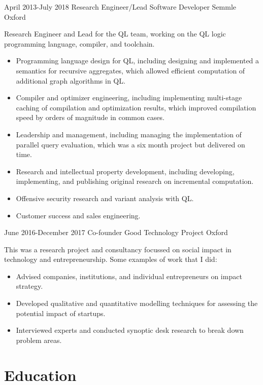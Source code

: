 \documentclass[12pt,a4paper,sans]{moderncv}
\begin{document}
\cventry
{April 2013-July 2018}
{Research Engineer/Lead Software Developer}
{Semmle}
{Oxford}
{}
{
  Research Engineer and Lead for the QL team, working on the QL logic programming language, compiler, and toolchain.
  \begin{itemize}
    \item Programming language design for QL, including designing and implemented a semantics for recursive aggregates, which allowed efficient computation of additional graph algorithms in QL.
    \item Compiler and optimizer engineering, including implementing multi-stage caching of compilation and optimization results, which improved compilation speed by orders of magnitude in common cases.
    \item Leadership and management, including managing the implementation of parallel query evaluation, which was a six month project but delivered on time.
    \item Research and intellectual property development, including developing, implementing, and publishing original research on incremental computation.
    \item Offensive security research and variant analysis with QL.
    \item Customer success and sales engineering.
  \end{itemize}
}

\cventry
{June 2016-December 2017}
{Co-founder}
{Good Technology Project}
{Oxford}
{}
{
  This was a research project and consultancy focussed on social impact in technology and entrepreneurship. 
  Some examples of work that I did:
  \begin{itemize}
    \item Advised companies, institutions, and individual entrepreneurs on impact strategy.
    \item Developed qualitative and quantitative modelling techniques for assessing the potential impact of startups.
    \item Interviewed experts and conducted synoptic desk research to break down problem areas.
  \end{itemize}
}

\nocite{*}
\printbibliography[title={Publications}]

\section{Education}
\end{document}
